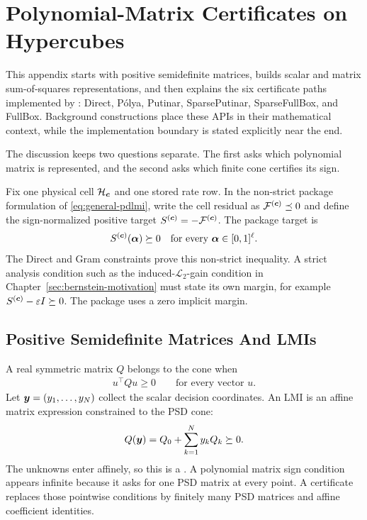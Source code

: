 \chapter{\texorpdfstring{Polynomial-Matrix Certificates on \mbox{Hypercubes}}{Polynomial-Matrix Certificates on Hypercubes}}
\label{app:certificates}

This appendix starts with positive semidefinite matrices, builds scalar and matrix sum-of-squares representations, and then explains the six certificate paths implemented by : Direct, P\'olya, Putinar, SparsePutinar, SparseFullBox, and FullBox. Background constructions place these APIs in their mathematical context, while the implementation boundary is stated explicitly near the end.

The discussion keeps two questions separate. The first asks which polynomial matrix is represented, and the second asks which finite cone certifies its sign.

Fix one physical cell $\mathcal H_{\boldsymbol{c}}$ and one stored rate row. In the non-strict package formulation of \cref{eq:general-pdlmi}, write the cell residual as $\mathcal F^{(\boldsymbol{c})}\preceq0$ and define the sign-normalized positive target $S^{(\boldsymbol{c})}=-\mathcal F^{(\boldsymbol{c})}$. The package target is
\begin{gather*}
 S^{(\boldsymbol{c})}(\boldsymbol{\alpha})\succeq0
  \quad\text{for every }\boldsymbol{\alpha}\in[0,1]^\ell.
\end{gather*}
The Direct and Gram constraints prove this non-strict inequality. A strict analysis condition such as the induced-$\mathcal L_2$-gain condition in Chapter~\ref{sec:bernstein-motivation} must state its own margin, for example $S^{(\boldsymbol{c})}-\varepsilon I\succeq0$. The package uses a zero implicit margin.

\section{Positive Semidefinite Matrices And LMIs}
\label{sec:certificate-psd}

A real symmetric matrix $Q$ belongs to the  cone when
\begin{gather*}
  u^\top Qu\ge0\qquad\text{for every vector }u.
\end{gather*}
Let $\boldsymbol{y}=(y_1,\ldots,y_N)$ collect the scalar decision coordinates. An LMI is an affine matrix expression constrained to the PSD cone:
\begin{gather*}
Q(\boldsymbol{y})=Q_0+\sum_{k=1}^{N}y_kQ_k\succeq0.
\end{gather*}
The unknowns enter affinely, so this is a . A polynomial matrix sign condition appears infinite because it asks for one PSD matrix at every point. A certificate replaces those pointwise conditions by finitely many PSD matrices and affine coefficient identities.

